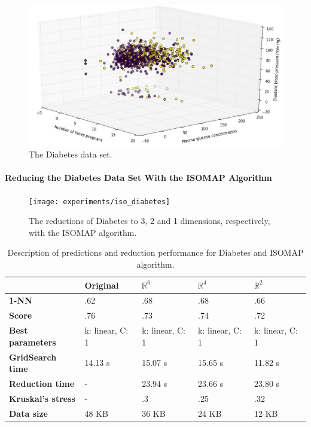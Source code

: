 \begin{figure}[H]
	\centering
	\includegraphics[width=\linewidth]{img/datasets/diabetes}
	\captionsetup{justification=centering}
	\caption{The Diabetes data set.}
	\label{fig:dsdiabetes}
\end{figure}

\newpage
\paragraph{Reducing the Diabetes Data Set With the ISOMAP Algorithm}

\begin{figure}[H]
	\centering
	\captionsetup{justification=centering}
	\texttt{[image: experiments/iso\_diabetes]}
	\caption{The reductions of Diabetes to 3, 2 and 1 dimensions, respectively, with the ISOMAP algorithm.}
	\label{fig:dsdiabetesiso}
\end{figure}

\begin{table}[H]
	\centering
	
	\begin{tabular}{|p{.15\linewidth}|p{.15\linewidth}|p{.15\linewidth}|p{.15\linewidth}|p{.15\linewidth}|}
		\hline
		& \textbf{Original} & $\mathbb{R}^6$ & $\mathbb{R}^4$ & $\mathbb{R}^2$ \\\hline
		\textbf{1-NN} & .62 & .68 & .68 & .66  \\\hline
		\textbf{Score} & .76 & .73 & .74 & .72 \\\hline
		\textbf{Best parameters} & k: linear, C: 1 & k: linear, C: 1 & k: linear, C: 1 & k: linear, C: 1 \\\hline
		\textbf{GridSearch time} & 14.13 s & 15.07 s & 15.65 s & 11.82 s \\\hline
		\textbf{Reduction time} & - & 23.94 s & 23.66 s & 23.80 s \\\hline
		\textbf{Kruskal's stress} & - & .3 & .25 & .32 \\\hline
		\textbf{Data size} & 48 KB & 36 KB & 24 KB & 12 KB \\\hline
	\end{tabular}
	\captionsetup{justification=centering}
	\caption{Description of predictions and reduction performance for Diabetes and ISOMAP algorithm.}
\end{table}
